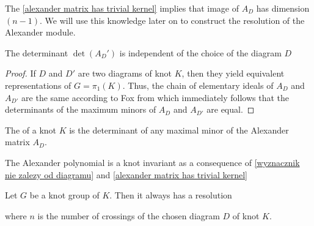 The \cref{alexander matrix has trivial kernel} implies that image of $A_D$ has dimension $(n-1)$. We will use this knowledge later on to construct the resolution of the Alexander module.

\begin{theorem}\label{wyznacznik nie zalezy od diagramu}
  The determinant $\det(A_D')$ is independent of the choice of the diagram $D$
\end{theorem}

\begin{proof}
  If $D$ and $D'$ are two diagrams of knot $K$, then they yield equivalent representations of $G=\pi_1(K)$. Thus, the chain of elementary ideals of $A_D$ and $A_{D'}$ are the same according to Fox \cite[Chapter~VII]{fox} from which immediately follows that the determinants of the maximum minors of $A_D$ and $A_{D'}$ are equal.
\end{proof}

\begin{definition}
  The  of a knot $K$ is the determinant of any maximal minor of the Alexander matrix $A_D$.
\end{definition}

The Alexander polynomial is a knot invariant as a consequence of \cref{wyznacznik nie zalezy od diagramu} and \cref{alexander matrix has trivial kernel}

\begin{proposition}
  Let $G$ be a knot group of $K$. Then it always has a resolution
  \begin{center}
  \end{center}
  where $n$ is the number of crossings of the chosen diagram $D$ of knot $K$.
\end{proposition}

